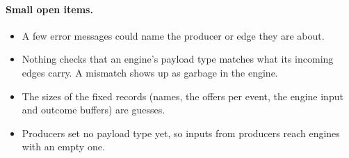 \documentclass[11pt]{article}
\begin{document}
\paragraph{Small open items.}
\begin{itemize}[nosep]
  \item A few error messages could name the producer or edge they are about.
  \item Nothing checks that an engine's payload type matches what its
        incoming edges carry. A mismatch shows up as garbage in the engine.
  \item The sizes of the fixed records (names, the offers per event, the
        engine input and outcome buffers) are guesses.
  \item Producers set no payload type yet, so inputs from producers reach
        engines with an empty one.
\end{itemize}
\end{document}
